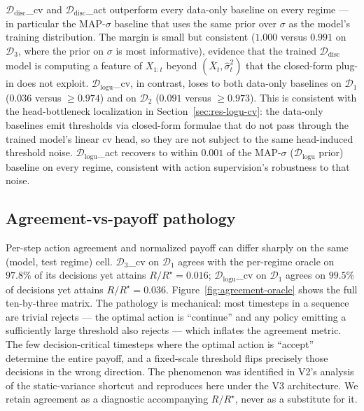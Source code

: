 \documentclass[11pt]{article}
\begin{document}
$\mathcal{D}_{\mathrm{disc}}$\_cv and $\mathcal{D}_{\mathrm{disc}}$\_act outperform every data-only baseline on every regime --- in particular the MAP-$\sigma$ baseline that uses the same prior over $\sigma$ as the model's training distribution. The margin is small but consistent ($1.000$ versus $0.991$ on $\mathcal{D}_3$, where the prior on $\sigma$ is most informative), evidence that the trained $\mathcal{D}_{\mathrm{disc}}$ model is computing a feature of $X_{1:t}$ beyond $(\bar X_t, \hat\sigma_t^2)$ that the closed-form plug-in does not exploit. $\mathcal{D}_{\mathrm{logu}}$\_cv, in contrast, loses to both data-only baselines on $\mathcal{D}_1$ ($0.036$ versus $\ge 0.974$) and on $\mathcal{D}_2$ ($0.091$ versus $\ge 0.973$). This is consistent with the head-bottleneck localization in Section~\ref{sec:res-logu-cv}: the data-only baselines emit thresholds via closed-form formulae that do not pass through the trained model's linear cv head, so they are not subject to the same head-induced threshold noise. $\mathcal{D}_{\mathrm{logu}}$\_act recovers to within $0.001$ of the MAP-$\sigma$ ($\mathcal{D}_{\mathrm{logu}}$ prior) baseline on every regime, consistent with action supervision's robustness to that noise.

\subsection{Agreement-vs-payoff pathology}
\label{sec:res-agreement}

Per-step action agreement and normalized payoff can differ sharply on the same (model, test regime) cell. $\mathcal{D}_3$\_cv on $\mathcal{D}_1$ agrees with the per-regime oracle on $97.8\%$ of its decisions yet attains $R/R^\star = 0.016$; $\mathcal{D}_{\mathrm{logu}}$\_cv on $\mathcal{D}_1$ agrees on $99.5\%$ of decisions yet attains $R/R^\star = 0.036$. Figure~\ref{fig:agreement-oracle} shows the full ten-by-three matrix. The pathology is mechanical: most timesteps in a sequence are trivial rejects --- the optimal action is ``continue'' and any policy emitting a sufficiently large threshold also rejects --- which inflates the agreement metric. The few decision-critical timesteps where the optimal action is ``accept'' determine the entire payoff, and a fixed-scale threshold flips precisely those decisions in the wrong direction. The phenomenon was identified in V2's analysis of the static-variance shortcut and reproduces here under the V3 architecture. We retain agreement as a diagnostic accompanying $R/R^\star$, never as a substitute for it.
\end{document}
